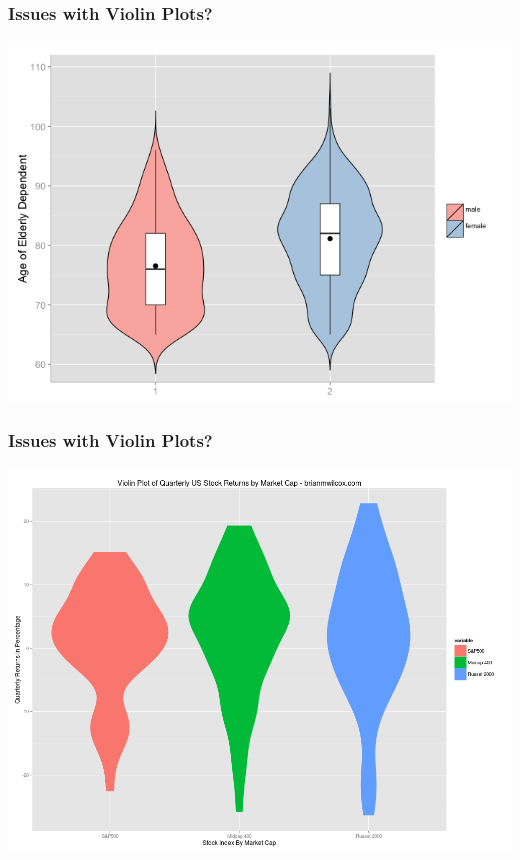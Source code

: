 \documentclass{beamer} %
\begin{document}
\begin{frame}\frametitle{Issues with Violin Plots?}
	\centering
	\includegraphics[width=\linewidth]{violin.png}
\end{frame}




\begin{frame}\frametitle{Issues with Violin Plots?}
	\centering
	\includegraphics[width=\linewidth]{violin2.png}
\end{frame}
\end{document}
